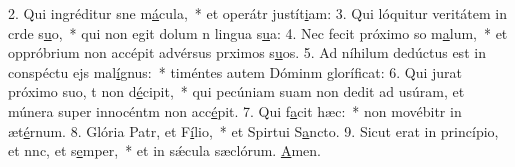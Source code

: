 2. Qui ingréditur sne m\uline{á}cula,~* et operátr justít\uline{i}am:
3. Qui lóquitur veritátem in crde s\uline{u}o,~* qui non egit dolum n lingua s\uline{u}a:
4. Nec fecit próximo so m\uline{a}lum,~* et oppróbrium non accépit advérsus prximos s\uline{u}os.
5. Ad níhilum dedúctus est in conspéctu ejs mal\uline{í}gnus:~* timéntes autem Dóminm gloríf\uline{i}cat:
6. Qui jurat próximo suo, t non d\uline{é}cipit,~* qui pecúniam suam non dedit ad usúram, et múnera super innocéntm non acc\uline{é}pit.
7. Qui f\uline{a}cit hæc:~* non movébitr in æt\uline{é}rnum.
8. Glória Patr, et F\uline{í}lio,~* et Spirtui S\uline{a}ncto.
9. Sicut erat in princípio, et nnc, et s\uline{e}mper,~* et in sǽcula sæclórum. \uline{A}men.
